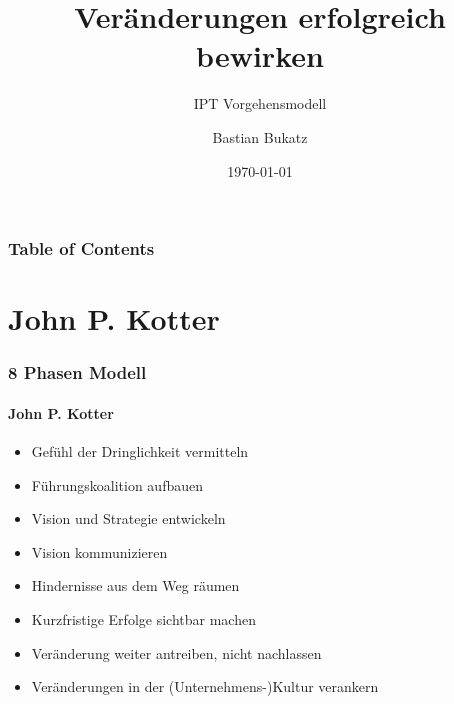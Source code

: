 \documentclass[aspectratio=169]{beamer}
\title{Veränderungen erfolgreich bewirken}
\subtitle{IPT Vorgehensmodell}
\author{Bastian Bukatz}
\institute{Innovation Process Technology}
\date{\today}
\begin{document}
\begin{frame}
\titlepage
\end{frame}


\begin{frame}
\frametitle{Table of Contents}
\tableofcontents
\end{frame}


\section{John P. Kotter}
\begin{frame}
\frametitle{8 Phasen Modell}\framesubtitle{John P. Kotter}
\begin{itemize}
\item Gefühl der Dringlichkeit vermitteln
\item Führungskoalition aufbauen
\item Vision und Strategie entwickeln
\item Vision kommunizieren
\item Hindernisse aus dem Weg räumen
\item Kurzfristige Erfolge sichtbar machen
\item Veränderung weiter antreiben, nicht nachlassen
\item Veränderungen in der (Unternehmens-)Kultur verankern
\end{itemize}
\end{frame}
\end{document}
